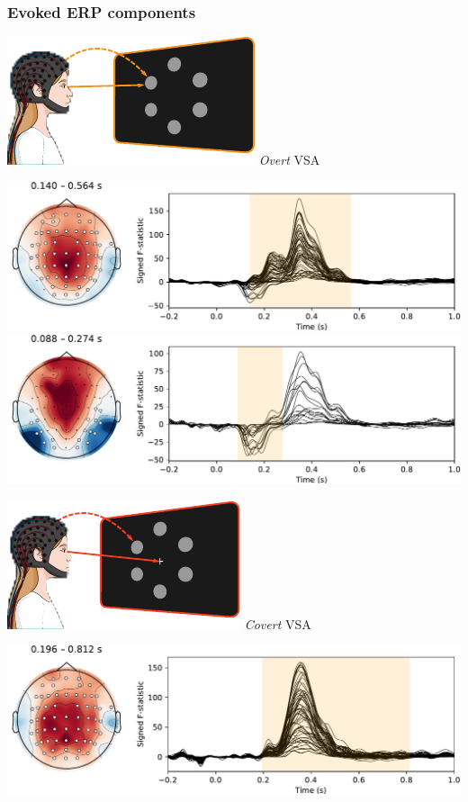 \documentclass{kul-ulille-beamer}
\begin{document}
\begin{frame}
  \frametitle{Evoked ERP components}
  \small
  \begin{minipage}[t]{.45\textwidth}
    \includegraphics[width=.2\textwidth]{figures/covert/attention_overt.pdf}
    \hspace{.5em}
    \emph{Overt} VSA
    \smallskip

    \includegraphics[width=\textwidth]{figures/covert/erps/erp_overt_cluster-1.pdf}
    \includegraphics[width=\textwidth]{figures/covert/erps/erp_overt_cluster-0.pdf}
  \end{minipage}\hfill%
  \begin{minipage}[t]{.45\textwidth}
    \includegraphics[width=.2\textwidth]{figures/covert/attention_covert.pdf}
    \hspace{.5em}
    \emph{Covert} VSA
    \smallskip

    \includegraphics[width=\textwidth]{figures/covert/erps/erp_covert_cluster-0.pdf}
    \smallskip


\end{minipage}
\end{frame}
\end{document}
